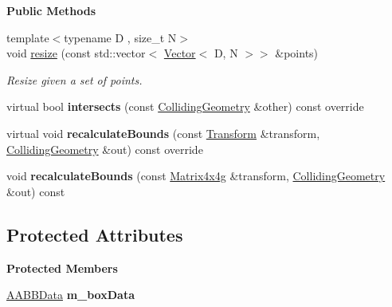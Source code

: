 \begin{Indent}\textbf{ Public Methods}\par
\begin{DoxyCompactItemize}
\item 
\mbox{\label{classrev_1_1_a_a_b_b_a57fdf4612f24334c72f21dd35bd02341}} 
{\footnotesize template$<$typename D , size\+\_\+t N$>$ }\\void \mbox{\hyperlink{classrev_1_1_a_a_b_b_a57fdf4612f24334c72f21dd35bd02341}{resize}} (const std\+::vector$<$ \mbox{\hyperlink{classrev_1_1_vector}{Vector}}$<$ D, N $>$$>$ \&points)
\begin{DoxyCompactList}\small\item\em Resize given a set of points. \end{DoxyCompactList}\item 
\mbox{\label{classrev_1_1_a_a_b_b_a2abbc3a91cce49b6c24775885e1d0dcb}} 
virtual bool {\bfseries intersects} (const \mbox{\hyperlink{classrev_1_1_colliding_geometry}{Colliding\+Geometry}} \&other) const override
\item 
\mbox{\label{classrev_1_1_a_a_b_b_a85187a35b47fea0b7b70275765f4b3dc}} 
virtual void {\bfseries recalculate\+Bounds} (const \mbox{\hyperlink{classrev_1_1_transform}{Transform}} \&transform, \mbox{\hyperlink{classrev_1_1_colliding_geometry}{Colliding\+Geometry}} \&out) const override
\item 
\mbox{\label{classrev_1_1_a_a_b_b_a4736a71bd5ff0bd106371ce59c2e1756}} 
void {\bfseries recalculate\+Bounds} (const \mbox{\hyperlink{classrev_1_1_square_matrix}{Matrix4x4g}} \&transform, \mbox{\hyperlink{classrev_1_1_colliding_geometry}{Colliding\+Geometry}} \&out) const
\end{DoxyCompactItemize}
\end{Indent}
\subsection*{Protected Attributes}
\begin{Indent}\textbf{ Protected Members}\par
\begin{DoxyCompactItemize}
\item 
\mbox{\label{classrev_1_1_a_a_b_b_a717938f5a1239f68332a3aaf6f3159c6}} 
\mbox{\hyperlink{structrev_1_1_a_a_b_b_data}{A\+A\+B\+B\+Data}} {\bfseries m\+\_\+box\+Data}
\end{DoxyCompactItemize}
\end{Indent}
